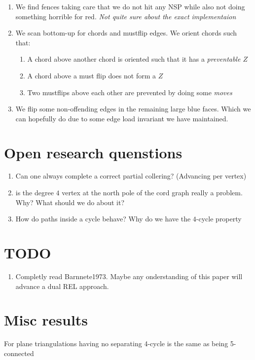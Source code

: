 \begin{enumerate}
  \item We find fences taking care that we do not hit any NSP while also not doing something horrible for red. \emph{Not quite sure about the exact implementaion}
  \item We scan bottom-up for chords and mustflip edges. We orient chords such that:
  \begin{enumerate}
    \item A chord above another chord is oriented such that it has a \emph{preventable $Z$}
    \item A chord above a must flip does not form a $Z$
    \item Two mustflips above each other are prevented by doing some \emph{moves}
  \end{enumerate}

  \item We flip some non-offending edges in the remaining large blue faces. Which we can hopefully do due to some edge load invariant we have maintained.
\end{enumerate}


\section{Open research quenstions}
  \begin{enumerate}
    \item Can one always complete a correct partial collering? (Advancing per vertex)
    \item is the degree $4$ vertex at the north pole of the cord graph really a problem. Why? What should we do about it?
    \item How do paths inside a cycle behave? Why do we have the $4$-cycle property
  \end{enumerate}

\section{TODO}
  \begin{enumerate}
    \item   Completly read Barnnete1973. Maybe any onderstanding of this paper will advance a dual REL approach.
  \end{enumerate}



\section{Misc results}
  \begin{lemma}
    \label{lm:5connIsNoSep4C}
    For plane triangulations having no separating 4-cycle is the same as being 5-connected
  \end{lemma}

